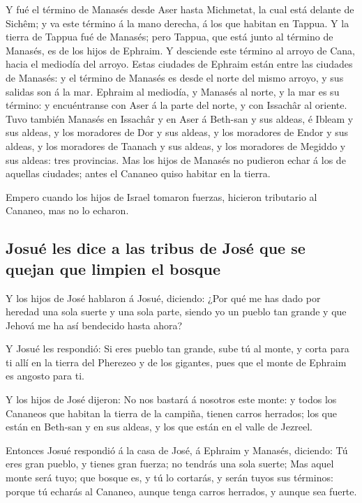  Y fué el término de Manasés desde Aser hasta Michmetat,
la cual está delante de Sichêm; y va este término á la mano derecha, á
los que habitan en Tappua.  Y la tierra de Tappua fué de
Manasés; pero Tappua, que está junto al término de Manasés, es de los
hijos de Ephraim.  Y desciende este término al arroyo de
Cana, hacia el mediodía del arroyo. Estas ciudades de Ephraim están
entre las ciudades de Manasés: y el término de Manasés es desde el norte
del mismo arroyo, y sus salidas son á la mar.  Ephraim al
mediodía, y Manasés al norte, y la mar es su término: y encuéntranse con
Aser á la parte del norte, y con Issachâr al oriente. 
Tuvo también Manasés en Issachâr y en Aser á Beth-san y sus aldeas, é
Ibleam y sus aldeas, y los moradores de Dor y sus aldeas, y los
moradores de Endor y sus aldeas, y los moradores de Taanach y sus
aldeas, y los moradores de Megiddo y sus aldeas: tres provincias.
 Mas los hijos de Manasés no pudieron echar á los de
aquellas ciudades; antes el Cananeo quiso habitar en la tierra.

 Empero cuando los hijos de Israel tomaron fuerzas,
hicieron tributario al Cananeo, mas no lo echaron.

\hypertarget{josuuxe9-les-dice-a-las-tribus-de-josuxe9-que-se-quejan-que-limpien-el-bosque}{%
\subsection{Josué les dice a las tribus de José que se quejan que
limpien el
bosque}\label{josuuxe9-les-dice-a-las-tribus-de-josuxe9-que-se-quejan-que-limpien-el-bosque}}

 Y los hijos de José hablaron á Josué, diciendo: ¿Por qué
me has dado por heredad una sola suerte y una sola parte, siendo yo un
pueblo tan grande y que Jehová me ha así bendecido hasta ahora?

 Y Josué les respondió: Si eres pueblo tan grande, sube
tú al monte, y corta para ti allí en la tierra del Pherezeo y de los
gigantes, pues que el monte de Ephraim es angosto para ti.

 Y los hijos de José dijeron: No nos bastará á nosotros
este monte: y todos los Cananeos que habitan la tierra de la campiña,
tienen carros herrados; los que están en Beth-san y en sus aldeas, y los
que están en el valle de Jezreel.

 Entonces Josué respondió á la casa de José, á Ephraim y
Manasés, diciendo: Tú eres gran pueblo, y tienes gran fuerza; no tendrás
una sola suerte;  Mas aquel monte será tuyo; que bosque
es, y tú lo cortarás, y serán tuyos sus términos: porque tú echarás al
Cananeo, aunque tenga carros herrados, y aunque sea fuerte.

